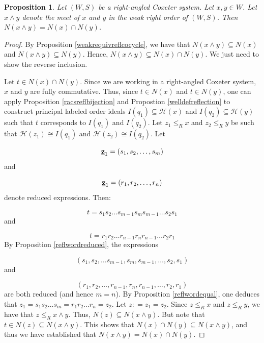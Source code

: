 \documentclass{amsart}
\theoremstyle{plain} %
\newtheorem{prop}[thm]{Proposition}
\theoremstyle{definition}
\def\weakr{\leq_{R}}
\def\H#1{\mathcal{H}(#1)}
\begin{document}
\begin{prop} \label{gimenezthmonedirection}
    Let $ (W,S)$ be a right-angled Coxeter system. Let $ x,y \in W$. Let $ x\wedge y$ denote the meet of $ x$ and $ y$ in the weak right order of $ (W,S)$. Then $ N(x\wedge y) = N(x) \cap N(y)$.
\end{prop}

\begin{proof}
    By Proposition \ref{weakrequivreflcocycle}, we have that $ N(x \wedge y) \subseteq N(x)$ and $ N(x\wedge y) \subseteq N(y)$. Hence, $ N(x\wedge y) \subseteq N(x) \cap N(y)$. We just need to show the reverse inclusion.

    Let $ t\in N(x) \cap N(y)$. Since we are working in a right-angled Coxeter system, $ x$ and $ y$ are fully commutative. Thus, since $ t\in N(x)$ and $ t\in N(y)$, one can apply Proposition \ref{racsreflbijection} and Propostion \ref{welldefreflection} to construct principal labeled order ideals $ I(q_{1}) \subseteq \H{x}$ and $ I(q_{2}) \subseteq \H{y}$ such that $ t$ corresponds to $ I(q_{1})$ and $ I(q_{2})$. Let $ z_{1} \weakr x$ and $ z_{2} \weakr y$ be such that $ \H{z_{1}} \cong I(q_{1})$ and $ \H{z_{2}}\cong I(q_{2})$. Let 

    $$ \textbf{\underline{z}}_{1} = (s_{1},s_{2}, \dots, s_{m}) $$
    and

    $$ \textbf{\underline{z}}_{1} = (r_{1}, r_{2}, \dots, r_{n})$$
    denote reduced expressions. Then:

    $$ t= s_{1}s_{2} \dots s_{m-1}s_{m}s_{m-1} \dots s_{2}s_{1}$$
    and

    $$ t= r_{1}r_{2} \dots r_{n-1}r_{n}r_{n-1} \dots r_{2}r_{1}$$
    By Proposition \ref{reflwordreduced}, the expressions 

    $$ (s_{1}, s_{2} , \dots s_{m-1}, s_{m}, s_{m-1} , \dots , s_{2}, s_{1}) $$
    and

    $$ (r_{1}, r_{2} ,\dots , r_{n-1}, r_{n}, r_{n-1}, \dots , r_{2}, r_{1})$$
    are both reduced (and hence $ m=n$). By Proposition \ref{reflwordequal}, one deduces that $ z_{1} =  s_{1}s_{2}\dots s_{m} = r_{1}r_{2} \dots r_{n}  = z_{2}$. Let $ z: = z_{1} = z_{2}$. Since $ z \weakr x$ and $ z\weakr y$, we have that $ z \weakr x\wedge y$. Thus, $ N(z ) \subseteq N(x\wedge y)$. But note that $ t\in N(z) \subseteq N(x\wedge y)$. This shows that $ N(x)\cap N(y) \subseteq N(x\wedge y)$, and thus we have established that $ N(x\wedge y) = N(x) \cap N(y)$.
\end{proof}
\end{document}
